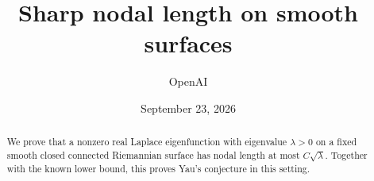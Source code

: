\documentclass[11pt]{article}
\title{Sharp nodal length on smooth surfaces}
\author{OpenAI}
\date{September 23, 2026}
\begin{document}
\maketitle
\begin{abstract}
We prove that a nonzero real Laplace eigenfunction with eigenvalue $\lambda>0$
on a fixed smooth closed connected Riemannian surface has nodal length at most
$C\sqrt\lambda$. Together with the known lower bound, this proves
Yau's conjecture in this setting.
\end{abstract}







\end{document}
